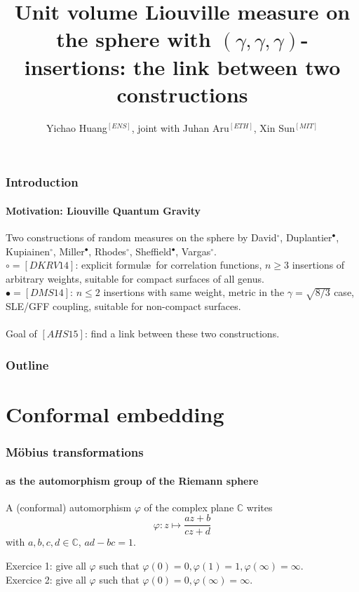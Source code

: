 \documentclass[aspectratio=169]{beamer}
\title[DKRV14 and DMS14]{Unit volume Liouville measure on the sphere with $(\gamma,\gamma,\gamma)$-insertions: the link between two constructions}
\author[Yichao Huang]{Yichao Huang$^{[ENS]}$, joint with Juhan Aru$^{[ETH]}$, Xin Sun$^{[MIT]}$}
\date[IH\'ES, 17 May 2016]{}
\begin{document}
\AtBeginSection{\frame{\sectionpage}}

\begin{frame}
\titlepage
\end{frame}

\begin{frame}
\frametitle{Introduction}
\framesubtitle{Motivation: Liouville Quantum Gravity}
Two constructions of random measures on the sphere by David$^\circ$, Duplantier$^\bullet$, Kupiainen$^\circ$, Miller$^\bullet$, Rhodes$^\circ$, Sheffield$^\bullet$, Vargas$^\circ$.\\
$\circ=[DKRV14]$: explicit formul\ae~for correlation functions, $n\geq 3$ insertions of arbitrary weights, suitable for compact surfaces of all genus.\\
$\bullet=[DMS14]$: $n\leq 2$ insertions with same weight, metric in the $\gamma=\sqrt{8/3}$ case, SLE/GFF coupling, suitable for non-compact surfaces.\\
~\\
Goal of $[AHS15]$: find a link between these two constructions.

\end{frame}

\begin{frame}
\frametitle{Outline}
\tableofcontents
\end{frame}


\section{Conformal embedding}

\begin{frame}
\frametitle{M\"obius transformations}
\framesubtitle{as the automorphism group of the Riemann sphere}
\begin{definition}
A (conformal) automorphism $\varphi$ of the complex plane $\mathbb{C}$ writes
$$\varphi: z\mapsto\frac{az+b}{cz+d}$$
with $a,b,c,d\in\mathbb{C}$, $ad-bc=1$.
\end{definition}
Exercice 1: give all $\varphi$ such that $\varphi(0)=0, \varphi(1)=1, \varphi(\infty)=\infty$.\\
Exercice 2: give all $\varphi$ such that $\varphi(0)=0, \varphi(\infty)=\infty$.
\end{frame}
\end{document}
